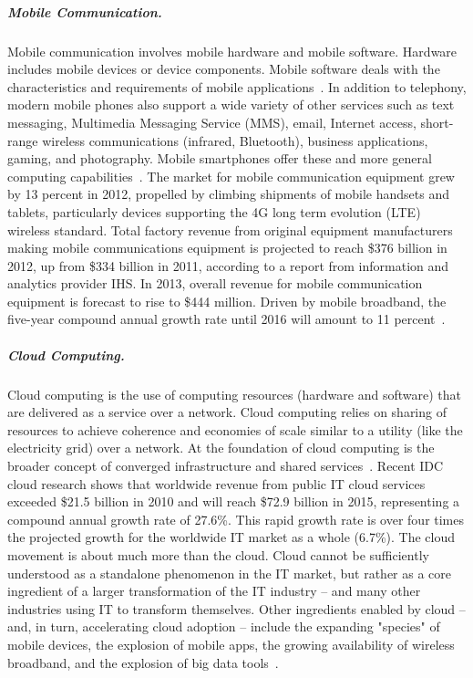 \documentclass{sbir}
\begin{document}
\vspace{-12pt}
\subparagraph{Mobile Communication.} Mobile communication involves mobile hardware and mobile software. Hardware includes mobile devices or device components. Mobile software deals with the characteristics and requirements of mobile applications~\cite{WikipediaMobileComputing:13}. In addition to telephony, modern mobile phones also support a wide variety of other services such as text messaging, Multimedia Messaging Service (MMS), email, Internet access, short-range wireless communications (infrared, Bluetooth), business applications, gaming, and photography. Mobile smartphones offer these and more general computing capabilities~\cite{WikipediaMobilePhone:13}.
The market for mobile communication equipment grew by 13 percent in 2012, propelled by climbing shipments of mobile handsets and tablets, particularly devices supporting the 4G long term evolution (LTE) wireless standard. Total factory revenue from original equipment manufacturers making mobile communications equipment is projected to reach \$376 billion in 2012, up from \$334 billion in 2011, according to a report from information and analytics provider IHS. In 2013, overall revenue for mobile communication equipment is forecast to rise to \$444 million. Driven by mobile broadband, the five-year compound annual growth rate until 2016 will amount to 11 percent~\cite{Si:12}.

\vspace{-12pt}
\subparagraph{Cloud Computing.} Cloud computing is the use of computing resources (hardware and software) that are delivered as a service over a network. Cloud computing relies on sharing of resources to achieve coherence and economies of scale similar to a utility (like the electricity grid) over a network. At the foundation of cloud computing is the broader concept of converged infrastructure and shared services~\cite{WikipediaCloud:13}.
Recent IDC cloud research shows that worldwide revenue from public IT cloud services exceeded \$21.5 billion in 2010 and will reach \$72.9 billion in 2015, representing a compound annual growth rate of 27.6\%. This rapid growth rate is over four times the projected growth for the worldwide IT market as a whole (6.7\%). The cloud movement is about much more than the cloud. Cloud cannot be sufficiently understood as a standalone phenomenon in the IT market, but rather as a core ingredient of a larger transformation of the IT industry -- and many other industries using IT to transform themselves. Other ingredients enabled by cloud -- and, in turn, accelerating cloud adoption -- include the expanding "species" of mobile devices, the explosion of mobile apps, the growing availability of wireless broadband, and the explosion of big data tools~\cite{IDCCloud:13}.
\end{document}
